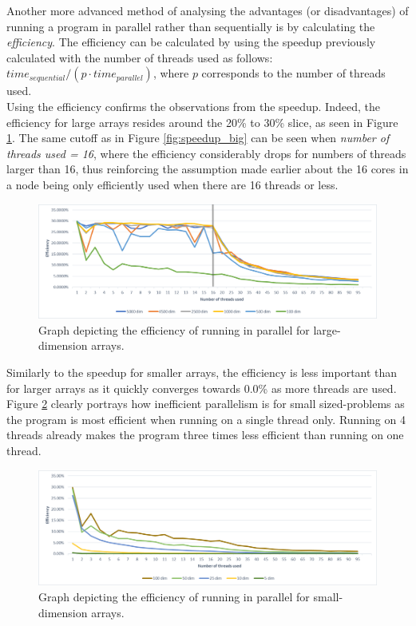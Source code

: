 \documentclass[letterpaper,12pt]{article}
\begin{document}
Another more advanced method of analysing the advantages (or disadvantages) of running a program in parallel rather than sequentially is by calculating the \textit{efficiency}. The efficiency can be calculated by using the speedup previously calculated with the number of threads used as follows: $time_{sequential} / (p \cdot time_{parallel})$, where $p$ corresponds to the number of threads used.\\

Using the efficiency confirms the observations from the speedup. Indeed, the efficiency for large arrays resides around the 20\% to 30\% slice, as seen in Figure \ref{fig:efficiency_big}. The same cutoff as in Figure \ref{fig:speedup_big} can be seen when \textit{number of threads used = 16}, where the efficiency considerably drops for numbers of threads larger than 16, thus reinforcing the assumption made earlier about the 16 cores in a node being only efficiently used when there are 16 threads or less.

\begin{figure}[h]
\centerline{\includegraphics[width=\textwidth]{report/plots/efficiency_big.png}}
\caption{\label{fig:efficiency_big}Graph depicting the efficiency of running in parallel for large-dimension arrays.}
\end{figure}

Similarly to the speedup for smaller arrays, the efficiency is less important than for larger arrays as it quickly converges towards 0.0\% as more threads are used. Figure \ref{fig:efficiency_small} clearly portrays how inefficient parallelism is for small sized-problems as the program is most efficient when running on a single thread only. Running on 4 threads already makes the program three times less efficient than running on one thread.\\

\begin{figure}[h]
\centerline{\includegraphics[width=\textwidth]{report/plots/efficiency_small.png}}
\caption{\label{fig:efficiency_small}Graph depicting the efficiency of running in parallel for small-dimension arrays.}
\end{figure}
\end{document}
